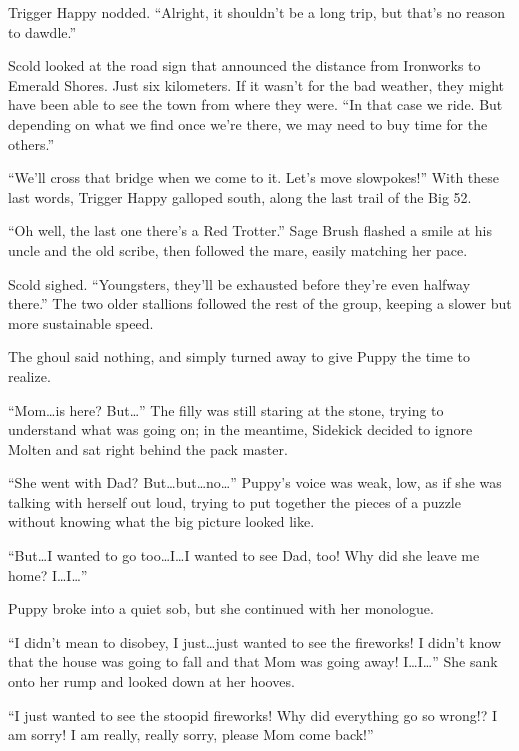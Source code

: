 Trigger Happy nodded. ``Alright, it shouldn't be a long trip, but that's no reason to dawdle.''

Scold looked at the road sign that announced the distance from Ironworks to Emerald Shores. Just six kilometers. If it wasn't for the bad weather, they might have been able to see the town from where they were. ``In that case we ride. But depending on what we find once we're there, we may need to buy time for the others.''

``We'll cross that bridge when we come to it. Let's move slowpokes!'' With these last words, Trigger Happy galloped south, along the last trail of the Big 52.

``Oh well, the last one there's a Red Trotter.'' Sage Brush flashed a smile at his uncle and the old scribe, then followed the mare, easily matching her pace.

Scold sighed. ``Youngsters, they'll be exhausted before they're even halfway there.'' The two older stallions followed the rest of the group, keeping a slower but more sustainable speed.

\horizonline


The ghoul said nothing, and simply turned away to give Puppy the time to realize.

``Mom\dots is here? But\dots'' The filly was still staring at the stone, trying to understand what was going on; in the meantime, Sidekick decided to ignore Molten and sat right behind the pack master.

``She went with Dad? But\dots but\dots no\dots'' Puppy's voice was weak, low, as if she was talking with herself out loud, trying to put together the pieces of a puzzle without knowing what the big picture looked like.

``But\dots I wanted to go too\dots I\dots I wanted to see Dad, too! Why did she leave me home? I\dots I\dots''

Puppy broke into a quiet sob, but she continued with her monologue.

``I didn't mean to disobey, I just\dots just wanted to see the fireworks! I didn't know that the house was going to fall and that Mom was going away! I\dots I\dots'' She sank onto her rump and looked down at her hooves.

``I just wanted to see the stoopid fireworks! Why did everything go so wrong!? I am sorry! I am really, really sorry, please Mom come back!''


